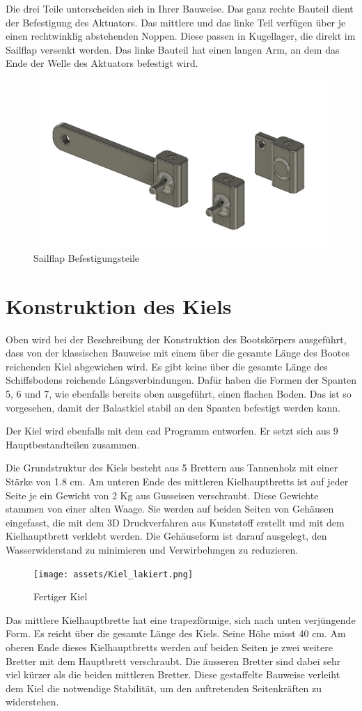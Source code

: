 Die drei Teile unterscheiden sich in Ihrer Bauweise. Das ganz rechte Bauteil dient der Befestigung des Aktuators. Das mittlere und das linke Teil verfügen über je einen rechtwinklig abstehenden Noppen. Diese passen in Kugellager, die direkt im Sailflap versenkt werden. Das linke Bauteil hat einen langen Arm, an dem das Ende der Welle des Aktuators befestigt wird.

\begin{figure}[H]
    \centering
    \includegraphics[width=0.75\linewidth]{assets/sailflap_3d.png}
    \caption{Sailflap Befestigungsteile}
    \label{fig:sailflap}
\end{figure}

\section{Konstruktion des Kiels}
Oben wird bei der Beschreibung der Konstruktion des Bootskörpers ausgeführt, dass von der klassischen Bauweise mit einem über die gesamte Länge des Bootes reichenden Kiel abgewichen wird. Es gibt keine über die gesamte Länge des Schiffsbodens reichende Längsverbindungen. Dafür haben die Formen der Spanten 5, 6 und 7, wie ebenfalls bereits oben ausgeführt, einen flachen Boden. Das ist so vorgesehen, damit der Balastkiel stabil an den Spanten befestigt werden kann.
 
Der Kiel wird ebenfalls mit dem \ac{cad} Programm entworfen. Er setzt sich aus 9 Hauptbestandteilen zusammen.

Die Grundstruktur des Kiels besteht aus 5 Brettern aus Tannenholz mit einer Stärke von 1.8 cm. Am unteren Ende des mittleren Kielhauptbretts ist auf jeder Seite je ein Gewicht von 2 Kg aus Gusseisen verschraubt. Diese Gewichte stammen von einer alten Waage. Sie werden auf beiden Seiten von Gehäusen eingefasst, die mit dem 3D Druckverfahren aus Kunststoff erstellt und mit dem Kielhauptbrett verklebt werden. Die Gehäuseform ist darauf ausgelegt, den Wasserwiderstand zu minimieren und Verwirbelungen zu reduzieren. 
\begin{figure} 
    \centering
    \texttt{[image: assets/Kiel\_lakiert.png]}
    \caption{Fertiger Kiel}
    \label{fig:enter-label}
\end{figure}
Das mittlere Kielhauptbrette hat eine trapezförmige, sich nach unten verjüngende Form. Es reicht über die gesamte Länge des Kiels. Seine Höhe misst 40 cm. Am oberen Ende dieses Kielhauptbretts werden auf beiden Seiten je zwei weitere Bretter mit dem Hauptbrett verschraubt. Die äusseren Bretter sind dabei sehr viel kürzer als die beiden mittleren Bretter. Diese gestaffelte Bauweise verleiht dem Kiel die notwendige Stabilität, um den auftretenden Seitenkräften zu widerstehen.

